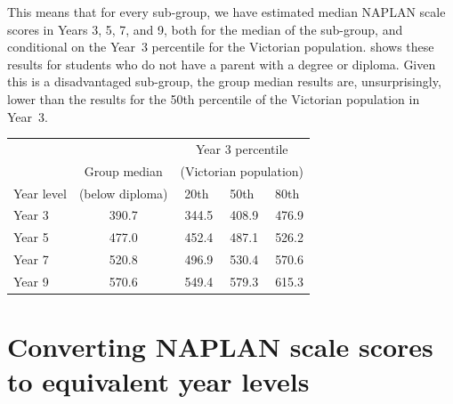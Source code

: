 This means that for every sub-group, we have estimated median NAPLAN scale scores in Years 3, 5, 7, and 9, both for the median of the sub-group, and conditional on the \mbox{Year 3} percentile for the Victorian population.  shows these results for students who do not have a parent with a degree or diploma. Given this is a disadvantaged sub-group, the group median results are, unsurprisingly, lower than the results for the 50th percentile of the Victorian population in \mbox{Year 3}.

\begin{table}[H]
  \centering

    \begin{tabular}{lcrrr}
          &       & \multicolumn{3}{c}{Year 3 percentile} \\

          & \multicolumn{1}{c}{Group median} & \multicolumn{3}{c}{(Victorian population)} \\     \cmidrule(lr){3-5}
    Year level & (below diploma) & \multicolumn{1}{c}{20th} & \multicolumn{1}{c}{50th} & \multicolumn{1}{c}{80th} \\ \midrule
    Year 3 & \multicolumn{1}{c}{390.7} & 344.5 & 408.9 & 476.9 \\
    Year 5 & \multicolumn{1}{c}{477.0} & 452.4 & 487.1 & 526.2 \\
    Year 7 & \multicolumn{1}{c}{520.8} & 496.9 & 530.4 & 570.6 \\
    Year 9 & \multicolumn{1}{c}{570.6} & 549.4 & 579.3 & 615.3 \\
    \bottomrule
    \end{tabular}%
  \label{tab:below_dip}%
\begin{flushleft}\end{flushleft}
\vspace{-15pt}
\end{table}%


\section{Converting NAPLAN scale scores to equivalent year levels}


